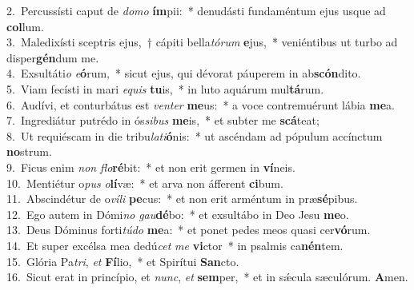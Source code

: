 {2.~}Percussísti caput de \textit{do}\textit{mo} \textbf{ím}pii:~* denudásti fundaméntum ejus usque ad \textbf{col}lum.\\
{3.~}Maledixísti sceptris ejus,~† cápiti bella\textit{tó}\textit{rum} \textbf{e}jus,~* veniéntibus ut turbo ad disper\textbf{gén}dum me.\\
{4.~}Exsultáti\textit{o} \textit{e}\textbf{ó}rum,~* sicut ejus, qui dévorat páuperem in ab\textbf{scón}dito.\\
{5.~}Viam fecísti in mari \textit{e}\textit{quis} \textbf{tu}is,~* in luto aquárum mul\textbf{tá}rum.\\
{6.~}Audívi, et conturbátus est \textit{ven}\textit{ter} \textbf{me}us:~* a voce contremuérunt lábia \textbf{me}a.\\
{7.~}Ingrediátur putrédo in ós\textit{si}\textit{bus} \textbf{me}is,~* et subter me \textbf{scá}teat;\\
{8.~}Ut requiéscam in die tribu\textit{la}\textit{ti}\textbf{ó}nis:~* ut ascéndam ad pópulum accínctum \textbf{no}strum.\\
{9.~}Ficus enim \textit{non} \textit{flo}\textbf{ré}bit:~* et non erit germen in \textbf{ví}neis.\\
{10.~}Mentiétur o\textit{pus} \textit{o}\textbf{lí}væ:~* et arva non áfferent \textbf{ci}bum.\\
{11.~}Abscindétur de o\textit{ví}\textit{li} \textbf{pe}cus:~* et non erit arméntum in præ\textbf{sé}pibus.\\
{12.~}Ego autem in Dómi\textit{no} \textit{gau}\textbf{dé}bo:~* et exsultábo in Deo Jesu \textbf{me}o.\\
{13.~}Deus Dóminus forti\textit{tú}\textit{do} \textbf{me}a:~* et ponet pedes meos quasi cer\textbf{vó}rum.\\
{14.~}Et super excélsa mea dedú\textit{cet} \textit{me} \textbf{vi}ctor~* in psalmis ca\textbf{nén}tem.\\
{15.~}Glória Pa\textit{tri}, \textit{et} \textbf{Fí}lio,~* et Spirítui \textbf{San}cto.\\
{16.~}Sicut erat in princípio, et \textit{nunc}, \textit{et} \textbf{sem}per,~* et in sǽcula sæculórum. \textbf{A}men.\\
